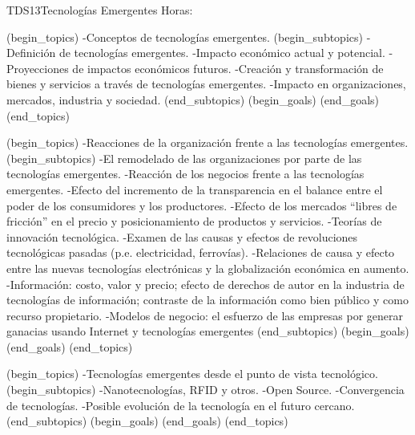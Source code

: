 \begin{BKL2}{TDS13}{Tecnologías Emergentes}
Horas:
 
(begin_topics)
-Conceptos de tecnologías emergentes.
(begin_subtopics)
-Definición de tecnologías emergentes.
-Impacto económico actual y potencial.
-Proyecciones de impactos económicos futuros.
-Creación y transformación de bienes y servicios a través de tecnologías emergentes.
-Impacto en organizaciones, mercados, industria y sociedad.
(end_subtopics)
(begin_goals)
(end_goals)
(end_topics)

(begin_topics)
-Reacciones de la organización frente a las tecnologías emergentes.
(begin_subtopics)
-El remodelado de las organizaciones por parte de las tecnologías emergentes.
-Reacción de los negocios frente a las tecnologías emergentes.
-Efecto del incremento de la transparencia en el balance entre el poder de los consumidores y los productores.
-Efecto de los mercados ``libres de fricción'' en el precio y posicionamiento de productos y servicios.
-Teorías de innovación tecnológica.
-Examen de las causas y efectos de revoluciones tecnológicas pasadas (p.e. electricidad, ferrovías).
-Relaciones de causa y efecto entre las nuevas tecnologías electrónicas y la globalización económica en aumento.
-Información: costo, valor y precio; efecto de derechos de autor en la industria de tecnologías de información; contraste de la información como bien público y como recurso propietario.
-Modelos de negocio: el esfuerzo de las empresas por generar ganacias usando Internet y tecnologías emergentes 
(end_subtopics)
(begin_goals)
(end_goals)
(end_topics)

(begin_topics)
-Tecnologías emergentes desde el punto de vista tecnológico.
(begin_subtopics)
-Nanotecnologías, RFID y otros.
-Open Source.
-Convergencia de tecnologías.
-Posible evolución de la tecnología en el futuro cercano.
(end_subtopics)
(begin_goals)
(end_goals)
(end_topics)


\end{BKL2}
